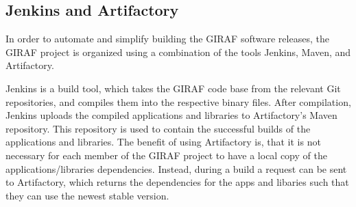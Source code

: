 \subsection{Jenkins and Artifactory}
In order to automate and simplify building the GIRAF software releases, the
GIRAF project is organized using a combination of the tools Jenkins, Maven, and
Artifactory.\nl

Jenkins is a build tool, which takes the GIRAF code base from the relevant Git
repositories, and compiles them into the respective binary files. After
compilation, Jenkins uploads the compiled applications and libraries to
Artifactory's Maven repository. This repository is used to contain the
successful builds of the applications and libraries. The benefit of using
Artifactory is, that it is not necessary for each member of the GIRAF project to
have a local copy of the applications/libraries dependencies. Instead, during a
build a request can be sent to Artifactory, which returns the dependencies for
the apps and libaries such that they can use the newest stable version.

